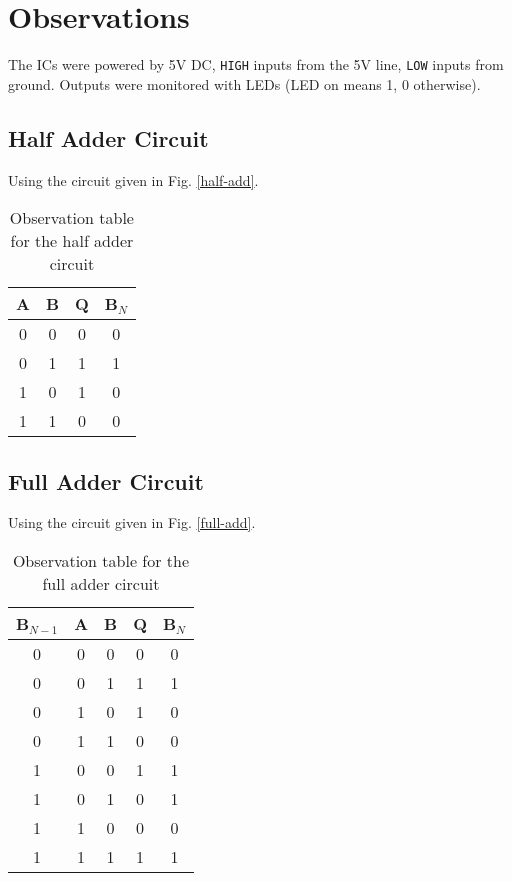 \section{Observations}

The ICs were powered by 5V DC, \verb|HIGH| inputs from the 5V line, \verb|LOW| inputs from ground. Outputs were monitored with LEDs (LED on means 1, 0 otherwise).

\subsection{Half Adder Circuit}

\noindent Using the circuit given in Fig. \ref{half-add}.
\begin{table}[H]
    \centering
    \begin{tabular}{|c|c|c|c|}\hline
    A & B & Q & B$_N$ \\ \hline
    0 & 0 & 0 & 0 \\ 
    0 & 1 & 1 & 1 \\ 
    1 & 0 & 1 & 0 \\ 
    1 & 1 & 0 & 0 \\ \hline
    \end{tabular}
    \caption{Observation table for the half adder circuit}
\end{table}

\subsection{Full Adder Circuit}

\noindent Using the circuit given in Fig. \ref{full-add}.
\begin{table}[H]
    \centering
    \begin{tabular}{|c|c|c|c|c|}\hline
        B$_{N-1}$ & A & B & Q & B$_N$ \\ \hline
        0 & 0 & 0 & 0 & 0 \\ 
        0 & 0 & 1 & 1 & 1 \\ 
        0 & 1 & 0 & 1 & 0 \\ 
        0 & 1 & 1 & 0 & 0 \\
        1 & 0 & 0 & 1 & 1 \\ 
        1 & 0 & 1 & 0 & 1 \\ 
        1 & 1 & 0 & 0 & 0 \\ 
        1 & 1 & 1 & 1 & 1 \\ \hline
    \end{tabular}
    \caption{Observation table for the full adder circuit}
\end{table}

